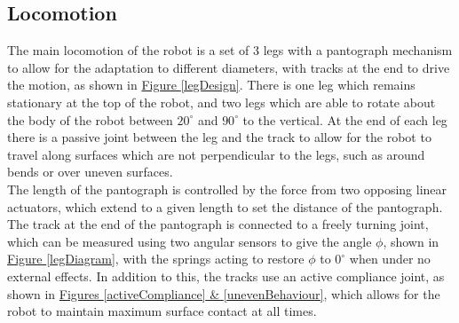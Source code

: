 \documentclass[11pt]{article}		%
\begin{document}
		\subsection{Locomotion}
			
			The main locomotion of the robot is a set of 3 legs with a pantograph mechanism  to allow for the adaptation to different diameters, with tracks at the end to drive the motion, as shown in \hyperref[legDesign]{Figure \ref*{legDesign}}.
			There is one leg which remains stationary at the top of the robot, and two legs which are able to rotate about the body of the robot between $20^\circ$ and $90^\circ$ to the vertical.
			At the end of each leg there is a passive joint between the leg and the track to allow for the robot to travel along surfaces which are not perpendicular to the legs, such as around bends or over uneven surfaces.
			\\
			The length of the pantograph is controlled by the force from two opposing linear actuators, which extend to a given length to set the distance of the pantograph.
			The track at the end of the pantograph is connected to a freely turning joint, which can be measured using two angular sensors to give the angle $\phi$, shown in \hyperref[legDiagram]{Figure \ref*{legDiagram}}, with the springs acting to restore $\phi$ to $0^\circ$ when under no external effects.
			In addition to this, the tracks use an active compliance joint, as shown in \hyperref[activeCompliance]{Figures \ref*{activeCompliance} \& \ref*{unevenBehaviour}}, which allows for the robot to maintain maximum surface contact at all times.
\end{document}
